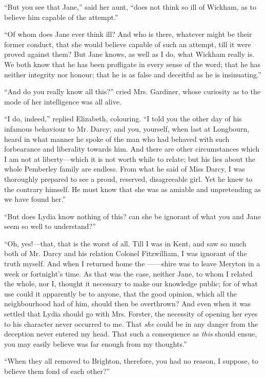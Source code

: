 ``But you see that Jane,'' said her aunt, ``does not think so ill of Wickham, as to believe him capable of the attempt.''

``Of whom does Jane ever think ill? And who is there, whatever might be their former conduct, that she would believe capable of such an attempt, till it were proved against them? But Jane knows, as well as I do, what Wickham really is. We both know that he has been profligate in every sense of the word; that he has neither integrity nor honour; that he is as false and deceitful as he is insinuating.''

``And do you really know all this?'' cried Mrs. Gardiner, whose curiosity as to the mode of her intelligence was all alive.

``I do, indeed,'' replied Elizabeth, colouring. ``I told you the other day of his infamous behaviour to Mr. Darcy; and you, yourself, when last at Longbourn, heard in what manner he spoke of the man who had behaved with such forbearance and liberality towards him. And there are other circumstances which I am not at liberty---which it is not worth while to relate; but his lies about the whole Pemberley family are endless. From what he said of Miss Darcy, I was thoroughly prepared to see a proud, reserved, disagreeable girl. Yet he knew to the contrary himself. He must know that she was as amiable and unpretending as we have found her.''

``But does Lydia know nothing of this? can she be ignorant of what you and Jane seem so well to understand?''

``Oh, yes!---that, that is the worst of all. Till I was in Kent, and saw so much both of Mr. Darcy and his relation Colonel Fitzwilliam, I was ignorant of the truth myself. And when I returned home the ------shire was to leave Meryton in a week or fortnight's time. As that was the case, neither Jane, to whom I related the whole, nor I, thought it necessary to make our knowledge public; for of what use could it apparently be to anyone, that the good opinion, which all the neighbourhood had of him, should then be overthrown? And even when it was settled that Lydia should go with Mrs. Forster, the necessity of opening her eyes to his character never occurred to me. That \textit{she} could be in any danger from the deception never entered my head. That such a consequence as \textit{this} should ensue, you may easily believe was far enough from my thoughts.''

``When they all removed to Brighton, therefore, you had no reason, I suppose, to believe them fond of each other?''

